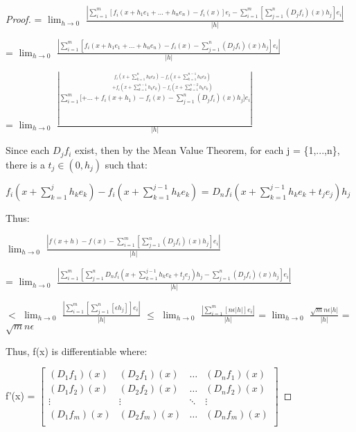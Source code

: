 \begin{proof}
        \hspace{0.5cm}
        = $\lim_{h \rightarrow 0}$
        $\frac{|\sum_{i=1}^m [f_i(x+h_1e_1+...+h_ne_n) - f_i(x)]e_i
                - \sum_{i=1}^m [\sum_{j=1}^n (D_jf_i)(x)h_j]e_i|}{|h|}$

        \hspace{0.5cm}
        = $\lim_{h \rightarrow 0}$
        $\frac{|\sum_{i=1}^m [f_i(x+h_1e_1+...+h_ne_n) - f_i(x)
                            - \sum_{j=1}^n (D_jf_i)(x)h_j]e_i|}{|h|}$

        \hspace{0.5cm}
        = $\lim_{h \rightarrow 0}$
        $\frac{|\sum_{i=1}^m \Bigg[
        \overset{f_i(x+\sum_{k=1}^n h_ke_k) - f_i(x+\sum_{k=1}^{n-1} h_ke_k)}
        {\overset{+ f_i(x+\sum_{k=1}^{n-1} h_ke_k) - f_i(x+\sum_{k=1}^{n-2} h_ke_k)}
        {+ ... + f_i(x+h_1) - f_i(x) - \sum_{j=1}^n (D_jf_i)(x)h_j}}
        \Bigg] e_i|}{|h|}$

        Since each $D_jf_i$ exist, then by the Mean Value Theorem,
        for each j = \{1,...,n\}, there is a $t_j \in (0,h_j)$ such that:

        \hspace{0.5cm}
        $f_i(x+\sum_{k=1}^j h_ke_k) - f_i(x+\sum_{k=1}^{j-1} h_ke_k)$
        = $D_nf_i(x+\sum_{k=1}^{j-1} h_ke_k+t_je_j)h_j$

        Thus:

        \hspace{0.5cm}
        $\lim_{h \rightarrow 0}$
        $\frac{|f(x+h) - f(x)
                - \sum_{i=1}^m [\sum_{j=1}^n (D_jf_i)(x)h_j]e_i|}{|h|}$

        \hspace{0.5cm}
        = $\lim_{h \rightarrow 0}$
        $\frac{|\sum_{i=1}^m
        [\sum_{j=1}^n D_nf_i(x+\sum_{k=1}^{j-1} h_ke_k+t_je_j)h_j
        - \sum_{j=1}^n (D_jf_i)(x)h_j]e_i|}{|h|}$

        \hspace{0.5cm}
        $<$ $\lim_{h \rightarrow 0}$
            $\frac{|\sum_{i=1}^m
            [\sum_{j=1}^n [\epsilon h_j]]e_i|}{|h|}$
        $\leq$ $\lim_{h \rightarrow 0}$
            $\frac{|\sum_{i=1}^m [n \epsilon |h|]e_i|}{|h|}$
        = $\lim_{h \rightarrow 0}$ $\frac{\sqrt{m}n\epsilon|h|}{|h|}$
        = $\sqrt{m}n\epsilon$

        Thus, f(x) is differentiable where:

        \hspace{0.5cm}
        f'(x) =
        $
        \begin{bmatrix}
            (D_1f_1)(x) & (D_2f_1)(x) & \hdots & (D_nf_1)(x) \\
            (D_1f_2)(x) & (D_2f_2)(x) & \hdots & (D_nf_2)(x) \\
            \vdots & \vdots & \ddots & \vdots \\
            (D_1f_m)(x) & (D_2f_m)(x) & \hdots & (D_nf_m)(x) \\
        \end{bmatrix}
        $


\end{proof}
